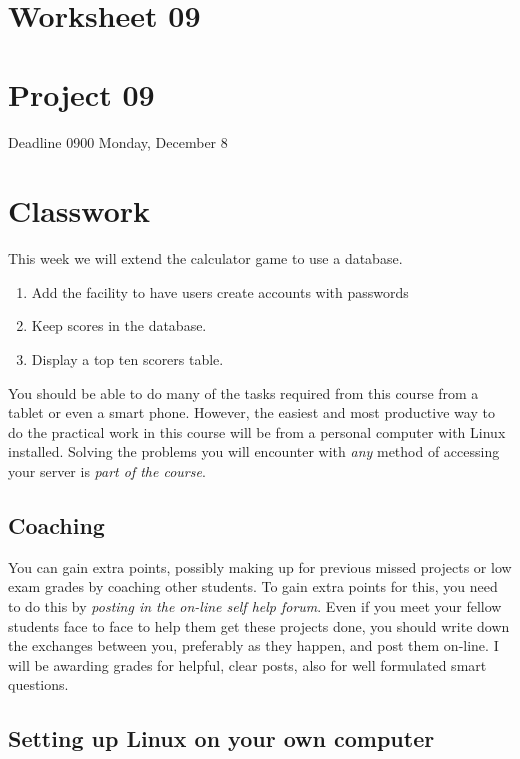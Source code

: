 \documentclass[12pt, a4paper]{article}
\begin{document}
\section*{Worksheet 09}
\section*{Project 09} 
Deadline 0900 Monday, December 8


\section*{Classwork}

This week we will extend the calculator game to use a database.

\begin{enumerate}
 \item Add the facility to have users create accounts with passwords
 \item Keep scores in the database.
 \item Display a top ten scorers table.
\end{enumerate}

You should be able to do many of the tasks required from this course from a tablet or even a smart phone. However, the easiest and most productive way to do the practical work in this course will be from a personal computer with Linux installed. Solving the problems you will encounter with \emph{any} method of accessing your server is \emph{part of the course}.

\subsection*{Coaching}

You can gain extra points, possibly making up for previous missed projects or low exam grades by coaching other students. To gain extra points for this, you need to do this by \emph{posting in the on-line self help forum}. Even if you meet your fellow students face to face to help them get these projects done, you should write down the exchanges between you, preferably as they happen, and post them on-line. I will be awarding grades for helpful, clear posts, also for well formulated smart questions. 

\subsection*{Setting up Linux on your own computer}
\end{document}
